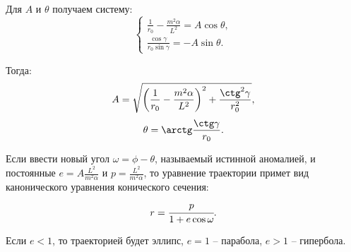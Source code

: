 Для \( A \) и \( \theta \) получаем систему:
\[
    \left\{\begin{array}{l}
        \frac{1}{r_0} -  \frac{m^2 \alpha}{ L^2} = A\cos\theta, \\
        \frac{ \cos\gamma}{ r_0 \sin\gamma} = - A\sin\theta.
    \end{array}\right.
\]
    
Тогда:
\[
    A = 
        \sqrt{\left
        (\frac{1}{r_0} -  \frac{m^2 \alpha}{ L^2}
        \right)^2+
        \frac{ \ctg^2 \gamma}{ r_0^2}},
\]   
\[
    \theta = \arctg\frac{\ctg\gamma}{r_0}.
\]   

Если ввести новый угол \( \omega = \phi - \theta \), называемый истинной
аномалией, и постоянные \( e = A\frac{L^2}{m^2 \alpha} \) и
\( p = \frac{L^2}{m^2 \alpha} \), то уравнение траектории примет вид
канонического уравнения конического сечения:
\[
    r = \cfrac{p}{1+e \cos \omega}.
\]   

Если \( e < 1 \), то траекторией будет эллипс, \( e = 1 \) -- парабола,
\( e > 1 \) -- гипербола.

\newpage
